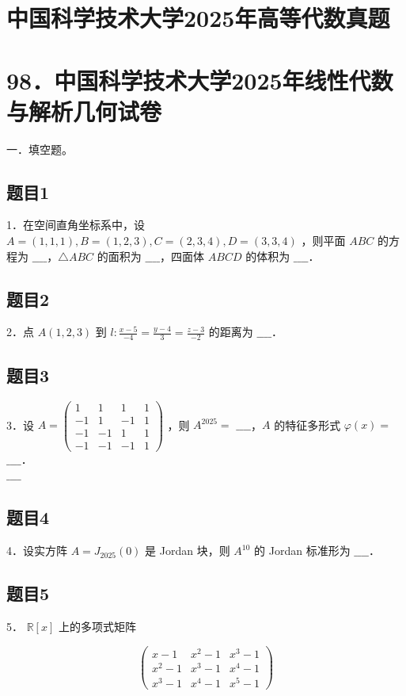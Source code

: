 \documentclass{article}
\begin{document}
\section*{中国科学技术大学2025年高等代数真题}
\section*{98．中国科学技术大学2025年线性代数与解析几何试卷}
一．填空题。\\

\subsection{题目1}
1．在空间直角坐标系中，设 \(A=(1,1,1), B=(1,2,3), C=(2,3,4), D=(3,3,4)\) ，则平面 \(A B C\) 的方程为 \(\_\_\_\_\)，\(\triangle A B C\) 的面积为 \(\_\_\_\_\)，四面体 \(A B C D\) 的体积为 \(\_\_\_\_\)．

\subsection{题目2}
2．点 \(A(1,2,3)\) 到 \(l: \frac{x-5}{-4}=\frac{y-4}{3}=\frac{z-3}{-2}\) 的距离为 \(\_\_\_\_\)．

\subsection{题目3}
3．设 \(A=\left(\begin{array}{cccc}1 & 1 & 1 & 1 \\ -1 & 1 & -1 & 1 \\ -1 & -1 & 1 & 1 \\ -1 & -1 & -1 & 1\end{array}\right)\) ，则 \(A^{2025}=\) \(\_\_\_\_\)，\(A\) 的特征多形式 \(\varphi(x)=\) \(\_\_\_\_\)．\\
\(\_\_\_\_\)

\subsection{题目4}
4．设实方阵 \(A=J_{2025}(0)\) 是 Jordan 块，则 \(A^{10}\) 的 Jordan 标准形为 \(\_\_\_\_\)．

\subsection{题目5}
5． \(\mathbb{R}[x]\) 上的多项式矩阵

\[
\left(\begin{array}{ccc}
x-1 & x^{2}-1 & x^{3}-1 \\
x^{2}-1 & x^{3}-1 & x^{4}-1 \\
x^{3}-1 & x^{4}-1 & x^{5}-1
\end{array}\right)
\]
\end{document}
